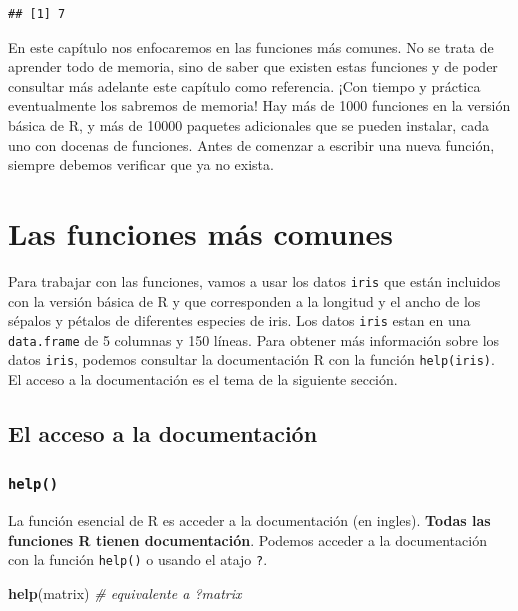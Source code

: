 \documentclass[]{book}
\newenvironment{Shaded}{\begin{snugshade}}{\end{snugshade}}
\newcommand{\KeywordTok}[1]{\textcolor[rgb]{0.13,0.29,0.53}{\textbf{#1}}}
\newcommand{\CommentTok}[1]{\textcolor[rgb]{0.56,0.35,0.01}{\textit{#1}}}
\newcommand{\NormalTok}[1]{#1}
\begin{document}
\begin{verbatim}
## [1] 7
\end{verbatim}

En este capítulo nos enfocaremos en las funciones más comunes. No se
trata de aprender todo de memoria, sino de saber que existen estas
funciones y de poder consultar más adelante este capítulo como
referencia. ¡Con tiempo y práctica eventualmente los sabremos de
memoria! Hay más de 1000 funciones en la versión básica de R, y más de
10000 paquetes adicionales que se pueden instalar, cada uno con docenas
de funciones. Antes de comenzar a escribir una nueva función, siempre
debemos verificar que ya no exista.

\section{Las funciones más comunes}\label{las-funciones-mas-comunes}

Para trabajar con las funciones, vamos a usar los datos \texttt{iris}
que están incluidos con la versión básica de R y que corresponden a la
longitud y el ancho de los sépalos y pétalos de diferentes especies de
iris. Los datos \texttt{iris} estan en una \texttt{data.frame} de 5
columnas y 150 líneas. Para obtener más información sobre los datos
\texttt{iris}, podemos consultar la documentación R con la función
\texttt{help(iris)}. El acceso a la documentación es el tema de la
siguiente sección.

\subsection{El acceso a la
documentación}\label{el-acceso-a-la-documentacion}

\subsubsection{\texorpdfstring{\texttt{help()}}{help()}}\label{l015help}

La función esencial de R es acceder a la documentación (en ingles).
\textbf{Todas las funciones R tienen documentación}. Podemos acceder a
la documentación con la función \texttt{help()} o usando el atajo
\texttt{?}.

\begin{Shaded}
\begin{Highlighting}[]
\KeywordTok{help}\NormalTok{(matrix) }\CommentTok{# equivalente a ?matrix}
\end{Highlighting}
\end{Shaded}
\end{document}
